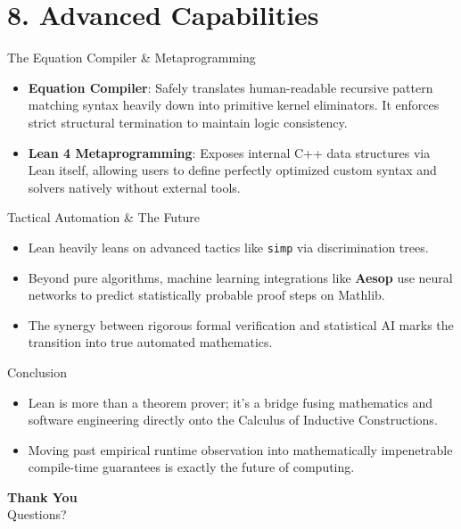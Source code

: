 \documentclass[12pt, aspectratio=169]{beamer}
\begin{document}
\section{8. Advanced Capabilities}

\begin{frame}{The Equation Compiler \& Metaprogramming}
\begin{itemize}\setlength{\itemsep}{1.2em}
  \item \textbf{Equation Compiler}: Safely translates human-readable recursive pattern matching syntax heavily down into primitive kernel eliminators. It enforces strict structural termination to maintain logic consistency.
  \item \textbf{Lean 4 Metaprogramming}: Exposes internal C++ data structures via Lean itself, allowing users to define perfectly optimized custom syntax and solvers natively without external tools.
\end{itemize}
\end{frame}

\begin{frame}{Tactical Automation \& The Future}
\begin{itemize}\setlength{\itemsep}{1.2em}
  \item Lean heavily leans on advanced tactics like \texttt{simp} via discrimination trees.
  \item Beyond pure algorithms, machine learning integrations like \textbf{Aesop} use neural networks to predict statistically probable proof steps on Mathlib.
  \item The synergy between rigorous formal verification and statistical AI marks the transition into true automated mathematics.
\end{itemize}
\end{frame}

\begin{frame}{Conclusion}
\begin{itemize}\setlength{\itemsep}{1.2em}
  \item Lean is more than a theorem prover; it's a bridge fusing mathematics and software engineering directly onto the Calculus of Inductive Constructions.
  \item Moving past empirical runtime observation into mathematically impenetrable compile-time guarantees is exactly the future of computing.
\end{itemize}
\end{frame}

\begin{frame}
  \begin{center}
      {\Huge \textbf{Thank You}} \\
      \vspace{1em}
      {Questions?}
  \end{center}
\end{frame}
\end{document}

